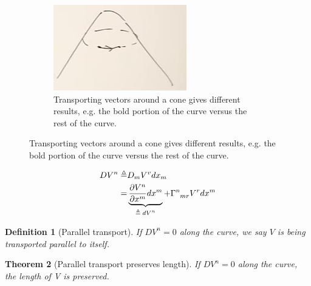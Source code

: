 \documentclass[]{article}
\newtheorem{thm}{Theorem}
\newtheorem{defn}[thm]{Definition}
\begin{document}
{\begin{figure}[H]
\begin{center}
\begin{subfigure}[t]{0.3\textwidth}
			\caption{Transporting vectors around a cone gives different results, e.g. the bold portion of the curve versus the rest of the curve. }\label{fig:gr-4-cone-round}
			\includegraphics[width=\textwidth]{gr-4-cone-round}
		\end{subfigure}
	\end{center}
\end{figure}

\begin{align*}
	DV^n \triangleq& D_m V^v dx_m\\
	=& \underbrace{\frac{\partial V^n}{\partial x^m} dx^m}_\text{$\triangleq dV^n $} + \Gamma \indices{^n_{mr}} V^r dx^m
\end{align*}

\begin{defn}[Parallel transport]
	If $DV^n=0$ along the curve, we say $V$ is being transported parallel to itself.
\end{defn}

\begin{thm}[Parallel transport preserves length]
	If $DV^n=0$ along the curve, the length of V is preserved.
\end{thm}

}
\end{document}
